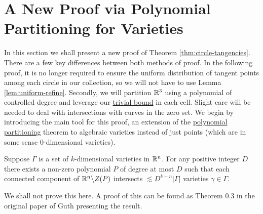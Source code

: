 \section[New Proof via Polynomial Partitioning]{A New Proof via Polynomial Partitioning for Varieties}
In this section we shall present a new proof of Theorem \ref{thm:circle-tangencies}. 
There are a few key differences between both methods of proof. In the following proof, 
it is no longer required to ensure the uniform distribution of tangent points among each circle in our collection, so we will not
have to use Lemma \ref{lem:uniform-refine}.
Secondly, we will partition $\mathbb R^3$ using a polynomial of controlled degree and leverage our \hyperref[thm:trivial-circle-bound]{trivial bound} in each cell.
Slight care will be needed to deal with intersections with curves in the zero set. We begin by introducing the main tool for this proof, 
an extension of the \hyperref[thm:PolyPartioning]{polynomial partitioning} theorem to algebraic varieties instead of just points (which are in some sense 0-dimensional varieties). 

\begin{lemma}
    Suppose $\Gamma$ is a set of $k$-dimensional varieties in $\mathbb R^n$. For any positive integer $D$ there exists a non-zero polynomial $P$ of degree at
    most $D$ such that each connected component of $\mathbb R^n \backslash Z(P)$ intersects $\lesssim D^{k-n} |\Gamma|$ varieties $\gamma \in \Gamma$.
    \label{lem:poly-part-var}
\end{lemma}
We shall not prove this here. A proof of this can be found as Theorem 0.3 in the original paper of Guth presenting the result.\cite{guth2015polypartvar}

